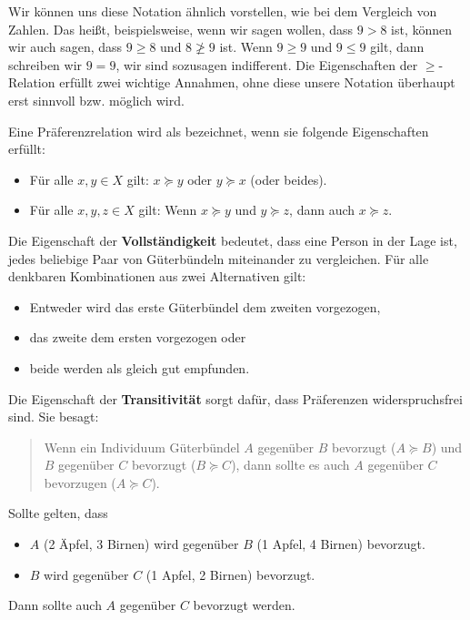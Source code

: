Wir können uns diese Notation ähnlich vorstellen, wie bei dem Vergleich von Zahlen. Das heißt, beispielsweise, wenn wir sagen wollen, dass $9 > 8$ ist, können wir auch sagen, dass $9 \ge 8$ und $8 \ngeq 9$ ist.
Wenn $9\ge 9$ und $9 \le 9$ gilt, dann schreiben wir $9=9$, wir sind sozusagen indifferent.
Die Eigenschaften der $\ge$-Relation erfüllt zwei wichtige Annahmen, ohne diese unsere Notation überhaupt erst sinnvoll bzw. möglich wird.
\begin{definition}
	Eine Präferenzrelation wird als  bezeichnet, wenn sie folgende Eigenschaften erfüllt:
	\begin{itemize}
		\item {} Für alle $x, y \in X$ gilt: $x \succeq y$ oder $y \succeq x$ (oder beides). 
		\item {} Für alle $x, y, z \in X$ gilt: Wenn $x \succeq y$ und $y \succeq z$, dann auch $x \succeq z$. 
	\end{itemize}
\end{definition}

Die Eigenschaft der \textbf{Vollständigkeit} bedeutet, dass eine Person in der Lage ist, jedes beliebige Paar von Güterbündeln miteinander zu vergleichen. Für alle denkbaren Kombinationen aus zwei Alternativen gilt:
\begin{itemize}
	\item Entweder wird das erste Güterbündel dem zweiten vorgezogen,
	\item das zweite dem ersten vorgezogen oder
	\item beide werden als gleich gut empfunden.
\end{itemize}


Die Eigenschaft der \textbf{Transitivität} sorgt dafür, dass Präferenzen widerspruchsfrei sind. Sie besagt:
\begin{quote}
	Wenn ein Individuum Güterbündel $A$ gegenüber $B$ bevorzugt ($A \succeq B$) und $B$ gegenüber $C$ bevorzugt ($B \succeq C$), dann sollte es auch $A$ gegenüber $C$ bevorzugen ($A \succeq C$).
\end{quote}

\begin{example}
	Sollte gelten, dass
	\begin{itemize}
		\item $A$ (2 Äpfel, 3 Birnen) wird gegenüber $B$ (1 Apfel, 4 Birnen) bevorzugt.
		\item $B$ wird gegenüber $C$ (1 Apfel, 2 Birnen) bevorzugt.
	\end{itemize}
	Dann sollte auch $A$ gegenüber $C$ bevorzugt werden.
\end{example}

